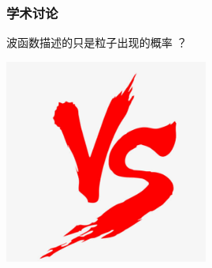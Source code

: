\begin{frame}
    \frametitle{学术讨论}
    {\color{red} \Large 波函数描述的只是粒子出现的概率 ？}  
    \begin{center}
        \includegraphics[width=0.5\textwidth]{figs/2021-12-06-11-44-50.png} \\
    \end{center} 
\end{frame}



